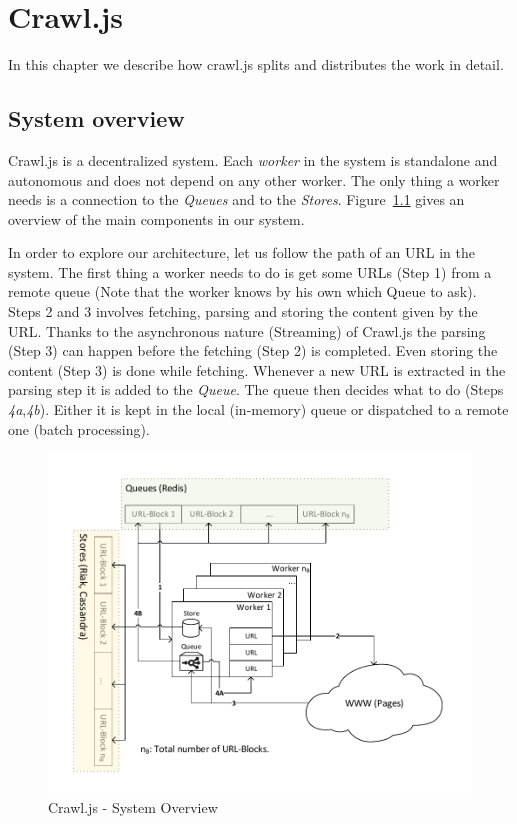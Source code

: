 
\chapter{Crawl.js} %
In this chapter we describe how crawl.js splits and distributes the work in detail.
\label{Chapter4} 

\section{System overview}
Crawl.js is a decentralized system. Each \emph{worker} in the system is standalone and autonomous and does not depend on any other worker. The only thing a worker needs is a connection to the \emph{Queues} and to the \emph{Stores}. Figure~\ref{system_overview} gives an overview of the main components in our system.

In order to explore our architecture, let us follow the path of an URL in the system.
The first thing a worker needs to do is get some URLs (Step 1) from a remote queue (Note that the worker knows by his own which Queue to ask). Steps 2 and 3 involves fetching, parsing and storing the content given by the URL. Thanks to the asynchronous nature (Streaming) of Crawl.js the parsing (Step 3) can happen before the fetching (Step 2) is completed. Even storing the content (Step 3) is done while fetching. Whenever a new URL is extracted in the parsing step it is added to the \emph{Queue}. The queue then decides what to do (Steps \emph{4a},\emph{4b}). Either it is kept in the local (in-memory) queue or dispatched to a remote one (batch processing).

\begin{figure}[h]
\centering
  \includegraphics[width=1\textwidth]{Figures/system_overview.pdf}
\caption{Crawl.js - System Overview}
\label{system_overview}
\end{figure}

